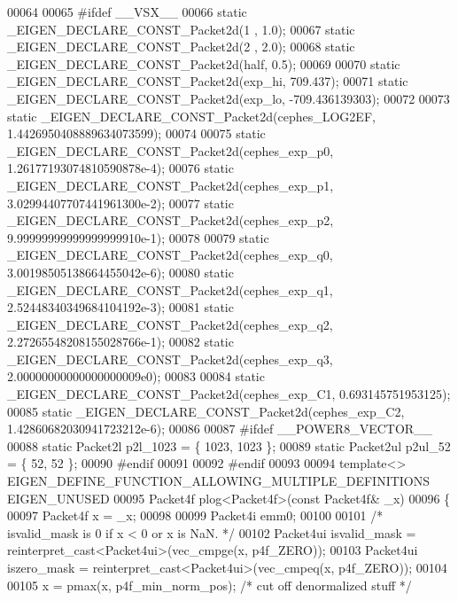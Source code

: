 \begin{DoxyCode}
00064 
00065 \textcolor{preprocessor}{#ifdef \_\_VSX\_\_}
00066 \textcolor{keyword}{static} \_EIGEN\_DECLARE\_CONST\_Packet2d(1 , 1.0);
00067 \textcolor{keyword}{static} \_EIGEN\_DECLARE\_CONST\_Packet2d(2 , 2.0);
00068 \textcolor{keyword}{static} \_EIGEN\_DECLARE\_CONST\_Packet2d(half, 0.5);
00069 
00070 \textcolor{keyword}{static} \_EIGEN\_DECLARE\_CONST\_Packet2d(exp\_hi,  709.437);
00071 \textcolor{keyword}{static} \_EIGEN\_DECLARE\_CONST\_Packet2d(exp\_lo, -709.436139303);
00072 
00073 \textcolor{keyword}{static} \_EIGEN\_DECLARE\_CONST\_Packet2d(cephes\_LOG2EF, 1.4426950408889634073599);
00074 
00075 \textcolor{keyword}{static} \_EIGEN\_DECLARE\_CONST\_Packet2d(cephes\_exp\_p0, 1.26177193074810590878e-4);
00076 \textcolor{keyword}{static} \_EIGEN\_DECLARE\_CONST\_Packet2d(cephes\_exp\_p1, 3.02994407707441961300e-2);
00077 \textcolor{keyword}{static} \_EIGEN\_DECLARE\_CONST\_Packet2d(cephes\_exp\_p2, 9.99999999999999999910e-1);
00078 
00079 \textcolor{keyword}{static} \_EIGEN\_DECLARE\_CONST\_Packet2d(cephes\_exp\_q0, 3.00198505138664455042e-6);
00080 \textcolor{keyword}{static} \_EIGEN\_DECLARE\_CONST\_Packet2d(cephes\_exp\_q1, 2.52448340349684104192e-3);
00081 \textcolor{keyword}{static} \_EIGEN\_DECLARE\_CONST\_Packet2d(cephes\_exp\_q2, 2.27265548208155028766e-1);
00082 \textcolor{keyword}{static} \_EIGEN\_DECLARE\_CONST\_Packet2d(cephes\_exp\_q3, 2.00000000000000000009e0);
00083 
00084 \textcolor{keyword}{static} \_EIGEN\_DECLARE\_CONST\_Packet2d(cephes\_exp\_C1, 0.693145751953125);
00085 \textcolor{keyword}{static} \_EIGEN\_DECLARE\_CONST\_Packet2d(cephes\_exp\_C2, 1.42860682030941723212e-6);
00086 
00087 \textcolor{preprocessor}{#ifdef \_\_POWER8\_VECTOR\_\_}
00088 \textcolor{keyword}{static} Packet2l p2l\_1023 = \{ 1023, 1023 \};
00089 \textcolor{keyword}{static} Packet2ul p2ul\_52 = \{ 52, 52 \};
00090 \textcolor{preprocessor}{#endif}
00091 
00092 \textcolor{preprocessor}{#endif}
00093 
00094 \textcolor{keyword}{template}<> EIGEN\_DEFINE\_FUNCTION\_ALLOWING\_MULTIPLE\_DEFINITIONS EIGEN\_UNUSED
00095 Packet4f plog<Packet4f>(\textcolor{keyword}{const} Packet4f& \_x)
00096 \{
00097   Packet4f x = \_x;
00098 
00099   Packet4i emm0;
00100 
00101   \textcolor{comment}{/* isvalid\_mask is 0 if x < 0 or x is NaN. */}
00102   Packet4ui isvalid\_mask = \textcolor{keyword}{reinterpret\_cast<}Packet4ui\textcolor{keyword}{>}(vec\_cmpge(x, p4f\_ZERO));
00103   Packet4ui iszero\_mask = \textcolor{keyword}{reinterpret\_cast<}Packet4ui\textcolor{keyword}{>}(vec\_cmpeq(x, p4f\_ZERO));
00104 
00105   x = pmax(x, p4f\_min\_norm\_pos);  \textcolor{comment}{/* cut off denormalized stuff */}

\end{DoxyCode}
